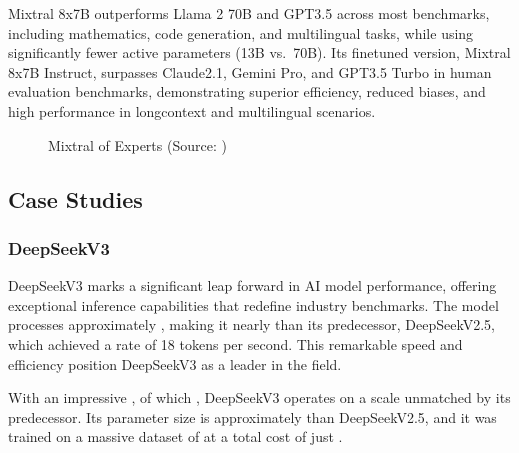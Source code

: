 \documentclass[letterpaper,11pt,english]{sphinxmanual}
\begin{document}
\sphinxAtStartPar
Mixtral 8x7B outperforms Llama 2 70B and GPT\sphinxhyphen{}3.5 across most benchmarks,
including mathematics, code generation, and multilingual tasks, while
using significantly fewer active parameters (13B vs. 70B). Its
fine\sphinxhyphen{}tuned version, Mixtral 8x7B \textendash{} Instruct, surpasses Claude\sphinxhyphen{}2.1,
Gemini Pro, and GPT\sphinxhyphen{}3.5 Turbo in human evaluation benchmarks,
demonstrating superior efficiency, reduced biases, and high performance
in long\sphinxhyphen{}context and multilingual scenarios.

\begin{figure}[htbp]
\centering
\capstart

\noindent{}
\caption{Mixtral of Experts (Source: )}\label{\detokenize{pretraining:id28}}\end{figure}


\subsection{Case Studies}
\label{\detokenize{pretraining:case-studies}}

\subsubsection{DeepSeek\sphinxhyphen{}V3}
\label{\detokenize{pretraining:deepseek-v3}}
\sphinxAtStartPar
DeepSeek\sphinxhyphen{}V3 marks a significant leap
forward in AI model performance, offering exceptional inference
capabilities that redefine industry benchmarks. The model processes
approximately , making it nearly  than its predecessor, DeepSeek\sphinxhyphen{}V2.5, which achieved a rate of
18 tokens per second. This remarkable speed and efficiency position
DeepSeek\sphinxhyphen{}V3 as a leader in the field.

\sphinxAtStartPar
With an impressive ,
of which , DeepSeek\sphinxhyphen{}V3 operates on
a scale unmatched by its predecessor. Its parameter size is
approximately  than DeepSeek\sphinxhyphen{}V2.5, and it was
trained on a massive dataset of  at
a total cost of just .
\end{document}
